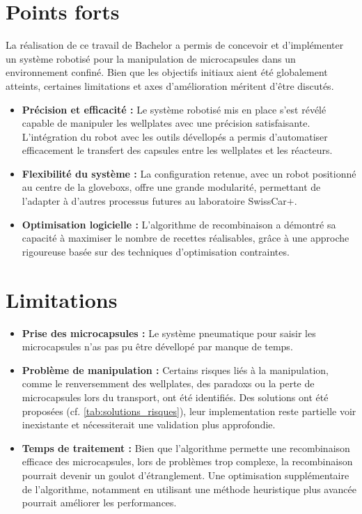 \section{Points forts}
La réalisation de ce travail de Bachelor a permis de concevoir et d'implémenter un système robotisé pour la manipulation de \glspl{microcapsule} dans un environnement confiné. Bien que les objectifs initiaux aient été globalement atteints, certaines limitations et axes d'amélioration méritent d'être discutés.
\begin{itemize}
    \item \textbf{Précision et efficacité :} Le système robotisé mis en place s'est révélé capable de manipuler les \glspl{wellplate} avec une précision satisfaisante. L'intégration du robot avec les outils dévellopés a permis d'automatiser efficacement le transfert des capsules entre les \glspl{wellplate} et les réacteurs.
    \item \textbf{Flexibilité du système :} La configuration retenue, avec un robot positionné au centre de la \glspl{glovebox}, offre une grande modularité, permettant de l'adapter à d'autres processus futures au laboratoire SwissCar$+$.
    \item \textbf{Optimisation logicielle :} L'algorithme de recombinaison a démontré sa capacité à maximiser le nombre de recettes réalisables, grâce à une approche rigoureuse basée sur des techniques d'optimisation contraintes.
\end{itemize}
\section{Limitations}
\begin{itemize}
    \item \textbf{Prise des microcapsules :} Le système pneumatique pour saisir les \glspl{microcapsule} n'as pas pu être dévellopé par manque de temps.
    \item \textbf{Problème de manipulation :} Certains risques liés à la manipulation, comme le renversemment des \glspl{wellplate}, des \glspl{paradox} ou la perte de \glspl{microcapsule} lors du transport, ont été identifiés. Des solutions ont été proposées (cf. \autoref{tab:solutions_risques}), leur implementation reste partielle voir inexistante et nécessiterait une validation plus approfondie.
    \item \textbf{Temps de traitement : } Bien que l'algorithme permette une recombinaison efficace des \glspl{microcapsule}, lors de problèmes trop complexe, la recombinaison pourrait devenir un goulot d'étranglement. Une optimisation supplémentaire de l'algorithme, notamment en utilisant une méthode heuristique plus avancée pourrait améliorer les performances. 
\end{itemize}
